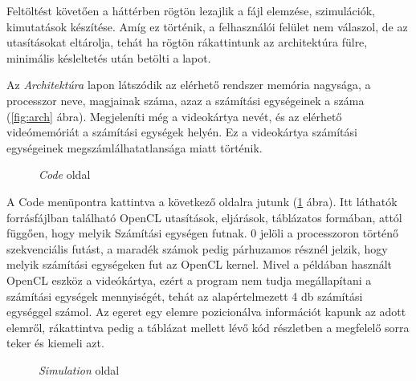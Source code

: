 Feltöltést követően a háttérben rögtön lezajlik a fájl elemzése, szimulációk, kimutatások készítése. Amíg ez történik, a felhasználói felület nem válaszol, de az utasításokat eltárolja, tehát ha rögtön rákattintunk az architektúra fülre, minimális késleltetés után betölti a lapot.



\newpage
Az \textit{Architektúra} lapon látszódik az elérhető rendszer memória nagysága, a processzor neve, magjainak száma, azaz a számítási egységeinek a száma (\ref{fig:arch} ábra). Megjeleníti még a videokártya nevét, és az elérhető videómemóriát a számítási egységek helyén. Ez a videokártya számítási egységeinek megszámlálhatatlansága miatt történik.

\begin{figure}[h]
\centering
{}
\caption{\textit{Code} oldal}
\label{fig:code}
\end{figure}


A Code menüpontra kattintva a következő oldalra jutunk (\ref{fig:code} ábra). Itt láthatók forrásfájlban található OpenCL utasítások, eljárások, táblázatos formában, attól függően, hogy melyik Számítási egységen futnak. 0 jelöli a processzoron történő szekvenciális futást, a maradék számok pedig párhuzamos résznél jelzik, hogy melyik számítási egységeken fut az OpenCL kernel. Mivel a példában használt OpenCL eszköz a videókártya, ezért a program nem tudja megállapítani a számítási egységek mennyiségét, tehát az alapértelmezett 4 db számítási egységgel számol. Az egeret egy elemre pozicionálva információt kapunk az adott elemről, rákattintva pedig a táblázat mellett lévő kód részletben a megfelelő sorra teker és kiemeli azt.

\begin{figure}[h]
\centering
{}
\caption{\textit{Simulation} oldal}
\label{fig:sim}
\end{figure}


